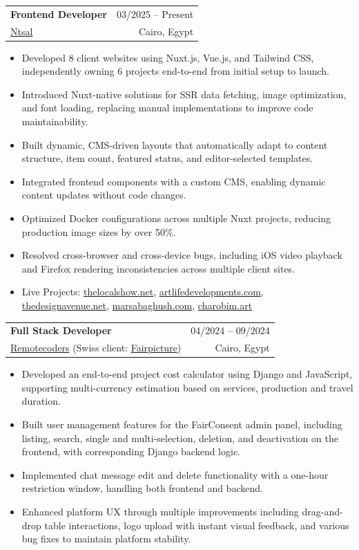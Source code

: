 \documentclass[a4paper,11pt]{article}
\makeatletter
\newcommand{\resumeItem}[1]{
  \item\small{
    {#1 \vspace{-1pt}}
  }
}
\newcommand{\resumeSubheading}[4]{
  \vspace{-2pt}\item
    \begin{tabular*}{0.97\textwidth}[t]{l@{\extracolsep{\fill}}r}
      \textbf{#1} & #2 \\
      \small#3 & \small #4 \\
    \end{tabular*}\vspace{-6pt}
}
\newcommand{\resumeItemListStart}{\begin{itemize}[leftmargin=0.2in]}
\newcommand{\resumeItemListEnd}{\end{itemize}\vspace{-4pt}}
\makeatother
\begin{document}
    \resumeSubheading
      {Frontend Developer}{03/2025 -- Present}
      {\href{https://ntsal.com}{Ntsal}}{Cairo, Egypt}
      \resumeItemListStart
        \resumeItem{Developed 8 client websites using Nuxt.js, Vue.js, and Tailwind CSS, independently owning 6 projects end-to-end from initial setup to launch.}
        \resumeItem{Introduced Nuxt-native solutions for SSR data fetching, image optimization, and font loading, replacing manual implementations to improve code maintainability.}
        \resumeItem{Built dynamic, CMS-driven layouts that automatically adapt to content structure, item count, featured status, and editor-selected templates.}
        \resumeItem{Integrated frontend components with a custom CMS, enabling dynamic content updates without code changes.}
        \resumeItem{Optimized Docker configurations across multiple Nuxt projects, reducing production image sizes by over 50\%.}
        \resumeItem{Resolved cross-browser and cross-device bugs, including iOS video playback and Firefox rendering inconsistencies across multiple client sites.}
        \resumeItem{Live Projects: \href{https://www.thelocalshow.net}{thelocalshow.net}, \href{https://www.artlifedevelopments.com}{artlifedevelopments.com}, \href{https://thedesignavenue.net}{thedesignavenue.net}, \href{https://marsabaghush.com}{marsabaghush.com}, \href{https://charobim.art}{charobim.art}}
      \resumeItemListEnd

    \vspace{4pt}
    \resumeSubheading
      {Full Stack Developer}{04/2024 -- 09/2024}
      {\href{https://remotecoders.org}{Remotecoders} (Swiss client: \href{https://fairpicture.org}{Fairpicture})}{Cairo, Egypt}
      \resumeItemListStart
        \resumeItem{Developed an end-to-end project cost calculator using Django and JavaScript, supporting multi-currency estimation based on services, production and travel duration.}
        \resumeItem{Built user management features for the FairConsent admin panel, including listing, search, single and multi-selection, deletion, and deactivation on the frontend, with corresponding Django backend logic.}
        \resumeItem{Implemented chat message edit and delete functionality with a one-hour restriction window, handling both frontend and backend.}
        \resumeItem{Enhanced platform UX through multiple improvements including drag-and-drop table interactions, logo upload with instant visual feedback, and various bug fixes to maintain platform stability.}
      \resumeItemListEnd
\end{document}
